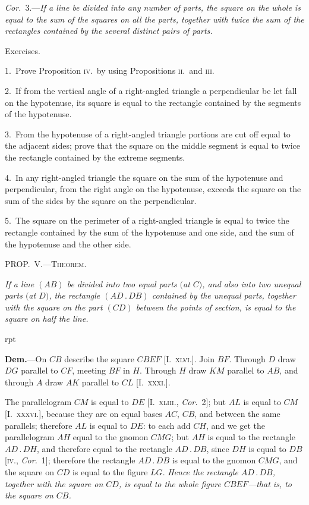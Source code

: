 \documentclass[oneside]{book}
\newcommand\mypropl[2]{
\bigskip\Needspace*{4\baselineskip}\begin{center}\textsc{#1}\end{center}
\hspace{\parindent}\emph{#2}\par\medskip
}
\newcommand\exhead[1]{
\Needspace*{5\baselineskip}\begin{center}
\textsf{#1}
\end{center}
}
\newcommand\imgflow[3]{
\setcounter{wrapwidth}{#1}
\begin{wrapfigure}[#2]{r}{\value{wrapwidth}pt}
\begin{center}
\vspace{-0.3in}
\end{center}
\end{wrapfigure}
}
\begin{document}
\textit{Cor.}\ 3.---\textit{If a line be divided into any number of parts,
the square on the whole is equal to the sum of the squares
on all the parts, together with twice the sum of the rectangles
contained by the several distinct pairs of parts.}


\exhead{Exercises.}

\begin{footnotesize}
1.~Prove Proposition \textsc{iv}.\ by using Propositions \textsc{ii}.\ and \textsc{iii}.

2.~If from the vertical angle of a right-angled triangle a perpendicular
be let fall on the hypotenuse, its square is equal to the
rectangle contained by the segments of the hypotenuse.

3.~From the hypotenuse of a right-angled triangle portions are
cut off equal to the adjacent sides; prove that the square on the
middle segment is equal to twice the rectangle contained by the
extreme segments.

4.~In any right-angled triangle the square on the sum of the
hypotenuse and perpendicular, from the right angle on the
hypotenuse, exceeds the square on the sum of the sides by the square
on the perpendicular.

5.~The square on the perimeter of a right-angled triangle is
equal to twice the rectangle contained by the sum of the
hypotenuse and one side, and the sum of the hypotenuse and the other
side.
\par\end{footnotesize}

\mypropl{PROP\@.~V.---Theorem.}{If a line $(AB)$ be divided into two equal parts $($at $C)$,
and also into two unequal parts $($at $D)$, the rectangle
$(AD\,.\,DB)$ contained by the unequal parts, together with
the square on the part $(CD)$ between the points of section,
is equal to the square on half the line.}

\imgflow{150}{7}{f084}

\textbf{Dem.}---On $CB$ describe the square $CBEF$ [I.~\textsc{xlvi}.].
Join $BF$. Through $D$ draw
$DG$ parallel to $CF$, meeting
$BF$ in $H$. Through $H$
draw $KM$ parallel to $AB$,
and through $A$ draw $AK$
parallel to $CL$ [I.~\textsc{xxxi}.].

The parallelogram $CM$
is equal to $DE$ [I.~\textsc{xliii}., \textit{Cor.}~2];\label{cor3} but $AL$ is equal to
$CM$ [I.~\textsc{xxxvi}.], because they are on equal bases $AC$,
$CB$, and between the same parallels; therefore $AL$ is
equal to $DE$: to each add $CH$, and we get the parallelogram
$AH$ equal to the gnomon $CMG$; but $AH$ is
equal to the rectangle $AD\,.\,DH$, and therefore equal
to the rectangle $AD\,.\,DB$, since $DH$ is equal to $DB$
[\textsc{iv}., \emph{Cor.}~1]; therefore the rectangle $AD\,.\,DB$ is
equal to the gnomon $CMG$, and the square on $CD$ is
equal to the figure $LG$. \textit{Hence the rectangle $AD\,.\,DB$,
together with the square on $CD$, is equal to the whole
figure $CBEF$---that is, to the square on $CB$.}
\end{document}
